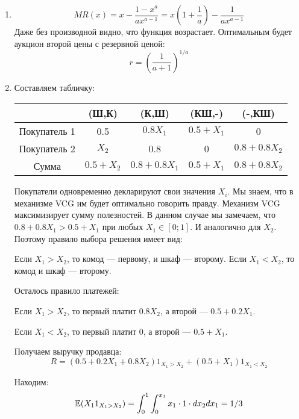 \begin{enumerate}

\item
\begin{equation}
MR(x)=x-\frac{1-x^{a}}{ax^{a-1}}=x\left(1+\frac{1}{a}\right)-\frac{1}{ax^{a-1}}
\end{equation}
Даже без производной видно, что функция возрастает. Оптимальным будет аукцион второй цены с резервной ценой:
\begin{equation}
r=\left(\frac{1}{a+1}\right)^{1/a}
\end{equation}

\item Составляем табличку:

\begin{tabular}{c|cccc}
& (Ш,К) & (К,Ш) & (КШ,-) & (-,КШ) \\
\hline
Покупатель 1 & 0.5 & $ 0.8X_{1} $ & $ 0.5+X_{1} $ & 0 \\
Покупатель 2 & $ X_{2} $ & 0.8 & 0 & $ 0.8+0.8X_{2} $ \\
Сумма & $ 0.5+X_{2} $& $ 0.8+0.8X_{1} $ & $ 0.5+X_{1} $ & $ 0.8+0.8X_{2} $ \\
\end{tabular}

Покупатели одновременно декларируют свои значения $ X_{i} $. Мы знаем, что в механизме VCG им будет оптимально говорить правду. Механизм VCG максимизирует сумму полезностей. В данном случае мы замечаем, что $ 0.8+0.8X_{1}>0.5+X_{1} $ при любых $ X_{1} \in [0;1]$. И аналогично для $ X_{2} $. Поэтому правило выбора решения имеет вид:

Если $ X_{1}>X_{2} $, то комод — первому, и шкаф — второму. Если $ X_{1}<X_{2} $, то комод и шкаф — второму.

Осталось правило платежей:

Если $ X_{1}>X_{2} $, то первый платит $ 0.8X_{2} $, а второй — $ 0.5+0.2X_{1} $.

Если $ X_{1}<X_{2} $, то первый платит 0, а второй — $ 0.5+X_{1} $.

Получаем выручку продавца:
\begin{equation}
R=(0.5+0.2X_{1}+0.8X_{2})1_{X_{1}>X_{2}}+(0.5+X_{1})1_{X_{1}<X_{2}}
\end{equation}

Находим:
\begin{equation}
\operatorname{\mathbb{E}}(X_{1}1_{X_{1}>X_{2}})=\int_{0}^{1}\int_{0}^{x_{1}}x_{1} \cdot 1 \cdot dx_{2}dx_{1}=1/3
\end{equation}


\end{enumerate}
